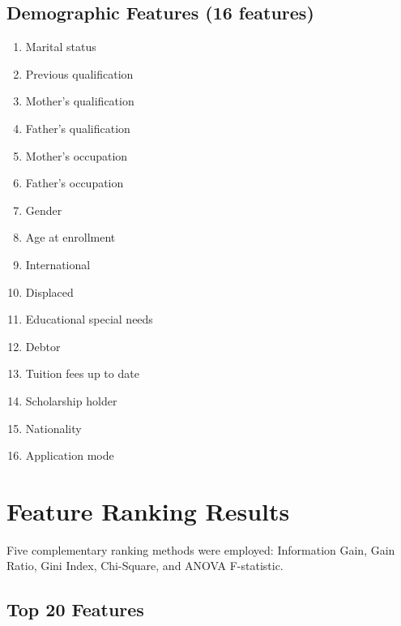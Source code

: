 \subsection{Demographic Features (16 features)}

\begin{enumerate}
    \item Marital status
    \item Previous qualification
    \item Mother's qualification
    \item Father's qualification
    \item Mother's occupation
    \item Father's occupation
    \item Gender
    \item Age at enrollment
    \item International
    \item Displaced
    \item Educational special needs
    \item Debtor
    \item Tuition fees up to date
    \item Scholarship holder
    \item Nationality
    \item Application mode
\end{enumerate}

\section{Feature Ranking Results}
\label{sec:feature_ranking}

Five complementary ranking methods were employed: Information Gain, Gain Ratio, Gini Index, Chi-Square, and ANOVA F-statistic.

\subsection{Top 20 Features}

